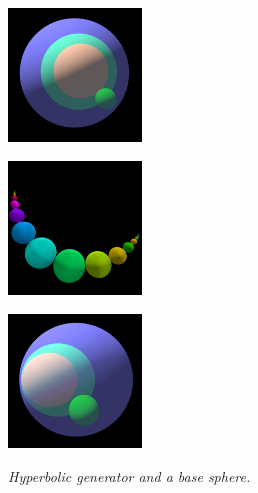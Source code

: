 \begin{figure}[h!tbp]
 \begin{minipage}{0.5\hsize}
  \begin{minipage}{0.25\hsize}
   \center
   \includegraphics[width=1.4in, height=1.4in, keepaspectratio]{./img/application/3dGen/loxoGenSimple.pdf}
   \label{fig:loxoGen3d}
  \end{minipage}
  \hspace*{\fill}
  \begin{minipage}{0.25\hsize}
   \center
   \includegraphics[width=1.4in, height=1.4in, keepaspectratio]{./img/application/3dGen/loxoOrbSimple.pdf}
   \label{fig:loxoOrb3d}
  \end{minipage}
  \hspace*{\fill}
 \caption{\textit{Hyperbolic generator and a base sphere.}}
  \label{fig:loxo3d}
 \end{minipage}
 \hspace*{\fill}
 \begin{minipage}{0.5\hsize}
  \begin{minipage}{0.25\hsize}
   \center
   \includegraphics[width=1.4in, height=1.4in, keepaspectratio]{./img/application/3dGen/parabolicOneGen.pdf}
   \label{fig:parabolic3dGen}
  \end{minipage}
  \hspace*{\fill}

\end{minipage}
\end{figure}

